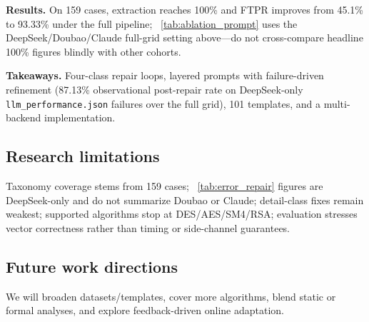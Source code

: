 \documentclass[12pt]{llncs}
\begin{document}
\textbf{Results.} On 159 cases, extraction reaches 100\% and FTPR improves from 45.1\% to 93.33\% under the full pipeline; \tablename~\ref{tab:ablation_prompt} uses the DeepSeek/Doubao/Claude full-grid setting above---do not cross-compare headline 100\% figures blindly with other cohorts.

\textbf{Takeaways.} Four-class repair loops, layered prompts with failure-driven refinement (87.13\% observational post-repair rate on DeepSeek-only \texttt{llm\_performance.json} failures over the full grid), 101 templates, and a multi-backend implementation.

\subsection{Research limitations}
Taxonomy coverage stems from 159 cases; \tablename~\ref{tab:error_repair} figures are DeepSeek-only and do not summarize Doubao or Claude; detail-class fixes remain weakest; supported algorithms stop at DES/AES/SM4/RSA; evaluation stresses vector correctness rather than timing or side-channel guarantees.

\subsection{Future work directions}
We will broaden datasets/templates, cover more algorithms, blend static or formal analyses, and explore feedback-driven online adaptation.


\renewcommand{\refname}{References}
\renewcommand{\bibname}{References}

 
\end{document}
